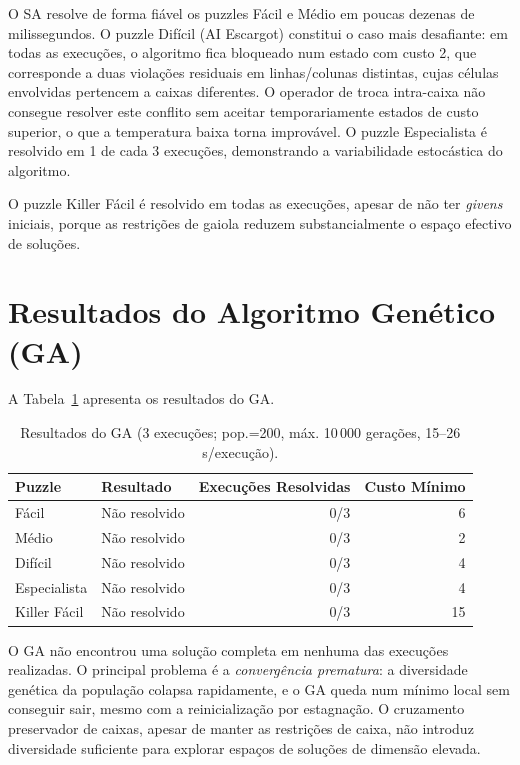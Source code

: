 O SA resolve de forma fiável os puzzles Fácil e Médio em poucas dezenas de milissegundos. O puzzle Difícil (AI Escargot) constitui o caso mais desafiante: em todas as execuções, o algoritmo fica bloqueado num estado com custo 2, que corresponde a duas violações residuais em linhas/colunas distintas, cujas células envolvidas pertencem a caixas diferentes. O operador de troca intra-caixa não consegue resolver este conflito sem aceitar temporariamente estados de custo superior, o que a temperatura baixa torna improvável. O puzzle Especialista é resolvido em 1 de cada 3 execuções, demonstrando a variabilidade estocástica do algoritmo.

O puzzle Killer Fácil é resolvido em todas as execuções, apesar de não ter \emph{givens} iniciais, porque as restrições de gaiola reduzem substancialmente o espaço efectivo de soluções.

\section{Resultados do Algoritmo Genético (GA)}
\label{sec:resultados_ga}

A Tabela~\ref{tab:ga} apresenta os resultados do GA.

\begin{table}[ht]
    \caption{Resultados do GA (3 execuções; pop.=200, máx. 10\,000 gerações, 15--26 s/execução).}
    \label{tab:ga}
    \centering
    \begin{tabular}{llrr}
        \toprule
        \textbf{Puzzle} & \textbf{Resultado} & \textbf{Execuções Resolvidas} & \textbf{Custo Mínimo} \\
        \midrule
        Fácil        & Não resolvido & 0/3 & 6 \\
        Médio        & Não resolvido & 0/3 & 2 \\
        Difícil      & Não resolvido & 0/3 & 4 \\
        Especialista & Não resolvido & 0/3 & 4 \\
        Killer Fácil & Não resolvido & 0/3 & 15 \\
        \bottomrule
    \end{tabular}
\end{table}

O GA não encontrou uma solução completa em nenhuma das execuções realizadas. O principal problema é a \emph{convergência prematura}: a diversidade genética da população colapsa rapidamente, e o GA queda num mínimo local sem conseguir sair, mesmo com a reinicialização por estagnação. O cruzamento preservador de caixas, apesar de manter as restrições de caixa, não introduz diversidade suficiente para explorar espaços de soluções de dimensão elevada.

